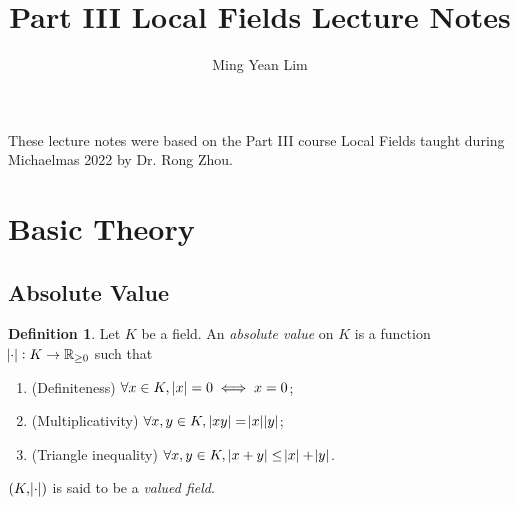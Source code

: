 \documentclass[11pt]{article}
\title{Part III Local Fields Lecture Notes}
\author{Ming Yean Lim}
\theoremstyle{definition}
\newtheorem{definition}{Definition}[subsection]
\theoremstyle{plain}
\theoremstyle{remark}
\newcommand{\RR}{\mathbb{R}}
\begin{document}
\maketitle

\noindent These lecture notes were based on the Part III course Local Fields taught during Michaelmas 2022 by Dr. Rong Zhou.

\tableofcontents

\newcommand{\sectionbreak}{\clearpage}

\section{Basic Theory}

\subsection{Absolute Value}

\begin{definition}\label{def:1_1}
    Let $K$ be a field. An \emph{absolute value} on $K$ is a function $\abs{\cdot} : K \to \RR_{\ge 0}$ such that
    \begin{enumerate}
        \item (Definiteness) $\forall x \in K,\, \abs{x} = 0 \iff x = 0$;
        \item (Multiplicativity) $\forall x, y \in K,\, \abs{x y} = \abs{x} \abs{y}$;
        \item (Triangle inequality) $\forall x, y \in K,\, \abs{x + y} \le \abs{x} + \abs{y}$.
    \end{enumerate}
    $(K, \abs{\cdot})$ is said to be a \emph{valued field}.
\end{definition}
\end{document}
